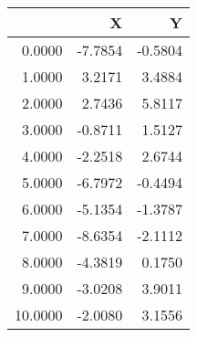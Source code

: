\begin{tabular}{rrr}
\hline
         &       X &       Y \\
\hline
  0.0000 & -7.7854 & -0.5804 \\
  1.0000 &  3.2171 &  3.4884 \\
  2.0000 &  2.7436 &  5.8117 \\
  3.0000 & -0.8711 &  1.5127 \\
  4.0000 & -2.2518 &  2.6744 \\
  5.0000 & -6.7972 & -0.4494 \\
  6.0000 & -5.1354 & -1.3787 \\
  7.0000 & -8.6354 & -2.1112 \\
  8.0000 & -4.3819 &  0.1750 \\
  9.0000 & -3.0208 &  3.9011 \\
 10.0000 & -2.0080 &  3.1556 \\
\hline
\end{tabular}